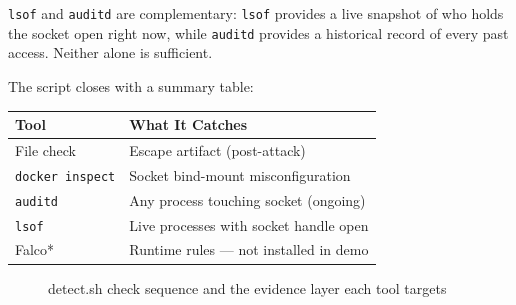 \texttt{lsof} and \texttt{auditd} are complementary: \texttt{lsof} provides a live snapshot of who holds the socket open right now, while \texttt{auditd} provides a historical record of every past access. Neither alone is sufficient.

The script closes with a summary table:

\begin{center}
\begin{tabular}{ll}
\hline
\textbf{Tool} & \textbf{What It Catches} \\
\hline
File check & Escape artifact (post-attack) \\
\texttt{docker inspect} & Socket bind-mount misconfiguration \\
\texttt{auditd} & Any process touching socket (ongoing) \\
\texttt{lsof} & Live processes with socket handle open \\
Falco* & Runtime rules --- not installed in demo \\
\hline
\end{tabular}
\end{center}

\begin{figure}[h]
\centering
\vspace{3cm}
\caption{detect.sh check sequence and the evidence layer each tool targets}
\end{figure}